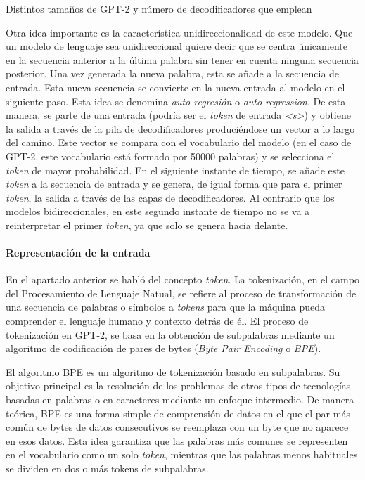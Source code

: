 %
{Distintos tamaños de GPT-2 y número de decodificadores que emplean}


Otra idea importante es la característica unidireccionalidad de este modelo. Que un modelo de lenguaje sea unidireccional quiere decir que se centra únicamente en la secuencia anterior a la última palabra sin tener en cuenta ninguna secuencia posterior. Una vez generada la nueva palabra, esta se añade a la secuencia de entrada. Esta nueva secuencia se convierte en la nueva entrada al modelo en el siguiente paso. Esta idea se denomina \textit{auto-regresión} o \textit{auto-regression}. De esta manera, se parte de una entrada (podría ser el \textit{token} de entrada \textit{<s>}) y obtiene la salida a través de la pila de decodificadores produciéndose un vector a lo largo del camino. Este vector se compara con el vocabulario del modelo (en el caso de GPT-2, este vocabulario está formado por 50000 palabras) y se selecciona el \textit{token} de mayor probabilidad. En el siguiente instante de tiempo, se añade este \textit{token} a la secuencia de entrada y se genera, de igual forma que para el primer \textit{token}, la salida a través de las capas de decodificadores. Al contrario que los modelos bidireccionales, en este segundo instante de tiempo no se va a reinterpretar el primer \textit{token}, ya que solo se genera hacia delante.

\paragraph{Representación de la entrada}\hfill


En el apartado anterior se habló del concepto \textit{token}. La tokenización, en el campo del Procesamiento de Lenguaje Natual, se refiere al proceso de transformación de una secuencia de palabras o símbolos a \textit{tokens} para que la máquina pueda comprender el lenguaje humano y contexto detrás de él. El proceso de tokenización en GPT-2, se basa en la obtención de subpalabras mediante un algoritmo de codificación de pares de bytes (\textit{Byte Pair Encoding} o \textit{BPE}).

El algoritmo BPE \citep{gage1994new} es un algoritmo de tokenización basado en subpalabras. Su objetivo principal es la resolución de los problemas de otros tipos de tecnologías basadas en palabras o en caracteres mediante un enfoque intermedio. De manera teórica, BPE es una forma simple de comprensión de datos en el que el par más común de bytes de datos consecutivos se reemplaza con un byte que no aparece en esos datos. Esta idea garantiza que las palabras más comunes se representen en el vocabulario como un solo \textit{token}, mientras que las palabras menos habituales se dividen en dos o más tokens de subpalabras.

